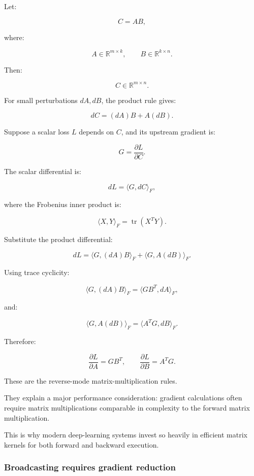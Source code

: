 \hypertarget{02-foundations-ii-ch022-differentiating-matrix-multiplication}{}

Let:

\[
C=AB,
\]

where:

\[
A\in\mathbb R^{m\times k},\qquad B\in\mathbb R^{k\times n}.
\]

Then:

\[
C\in\mathbb R^{m\times n}.
\]

For small perturbations \(dA,dB\), the product rule gives:

\[
\boxed{ dC=(dA)B+A(dB) }.
\]

Suppose a scalar loss \(L\) depends on \(C\), and its upstream gradient is:

\[
G=\frac{\partial L}{\partial C}.
\]

The scalar differential is:

\[
dL=\langle G,dC\rangle_F,
\]

where the Frobenius inner product is:

\[
\langle X,Y\rangle_F =\operatorname{tr}(X^TY).
\]

Substitute the product differential:

\[
dL=\langle G,(dA)B\rangle_F+ \langle G,A(dB)\rangle_F.
\]

Using trace cyclicity:

\[
\langle G,(dA)B\rangle_F =\langle GB^T,dA\rangle_F,
\]

and:

\[
\langle G,A(dB)\rangle_F =\langle A^TG,dB\rangle_F.
\]

Therefore:

\[
\boxed{ \frac{\partial L}{\partial A}=GB^T, \qquad \frac{\partial L}{\partial B}=A^TG }.
\]

These are the reverse-mode matrix-multiplication rules.

They explain a major performance consideration: gradient calculations often require matrix multiplications comparable in complexity to the forward matrix multiplication.

This is why modern deep-learning systems invest so heavily in efficient matrix kernels for both forward and backward execution.

\subsubsection{Broadcasting requires gradient reduction}\label{02-foundations-ii-ch022-broadcasting-requires-gradient-reduction}


